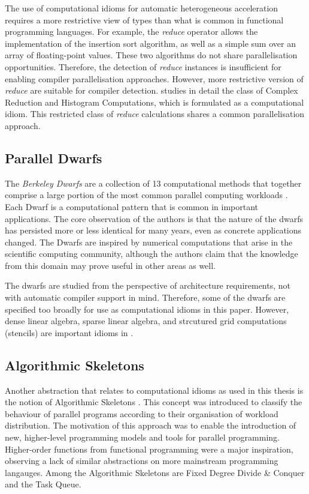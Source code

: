     The use of computational idioms for automatic heterogeneous acceleration
    requires a more restrictive view of types than what is common in
    functional programming languages.
    For example, the {\it reduce} operator allows the implementation of
    the insertion sort algorithm, as well as a simple sum over an array of
    floating-point values.
    These two algorithms do not share parallelisation opportunities.
    Therefore, the detection of {\it reduce} instances is insufficient for
    enabling compiler parallelisation approaches.
    However, more restrictive version of {\it reduce} are suitable for
    compiler detection.
     studies in detail the class of Complex Reduction
    and Histogram Computations, which is formulated as a computational idiom.
    This restricted class of {\it reduce} calculations shares a common
    parallelisation approach.

\subsection{Parallel Dwarfs}

    The {\it Berkeley Dwarfs} are a collection of 13 computational methods
    that together comprise a large portion of the most common parallel computing
    workloads \citep{Asanovic06thelandscape}.
    Each Dwarf is a computational pattern that is common in important
    applications.
    The core observation of the authors is that the nature of the dwarfs has
    persisted more or less identical for many years, even as concrete
    applications changed.
    The Dwarfs are inspired by numerical computations that arise in the
    scientific computing community, although the authors claim that the
    knowledge from this domain may prove useful in other areas as well.

    The dwarfs are studied from the perspective of architecture requirements,
    not with automatic compiler support in mind.
    Therefore, some of the dwarfs are specified too broadly for use as
    computational idioms in this paper.
    However, dense linear algebra, sparse linear algebra, and strcutured grid
    computations (stencils) are important idioms in .

\subsection{Algorithmic Skeletons}

    Another abstraction that relates to computational idioms as used in this
    thesis is the notion of Algorithmic Skeletons \citep{Cole1991Algorithmic}.
    This concept was introduced to classify the behaviour of parallel programs
    according to their organisation of workload distribution.
    The motivation of this approach was to enable the introduction of new,
    higher-level programming models and tools for parallel programming.
    Higher-order functions from functional programming were a major inspiration,
    observing a lack of similar abstractions on more mainstream programming
    langauges.
    Among the Algorithmic Skeletons are Fixed Degree Divide \& Conquer and the
    Task Queue.

